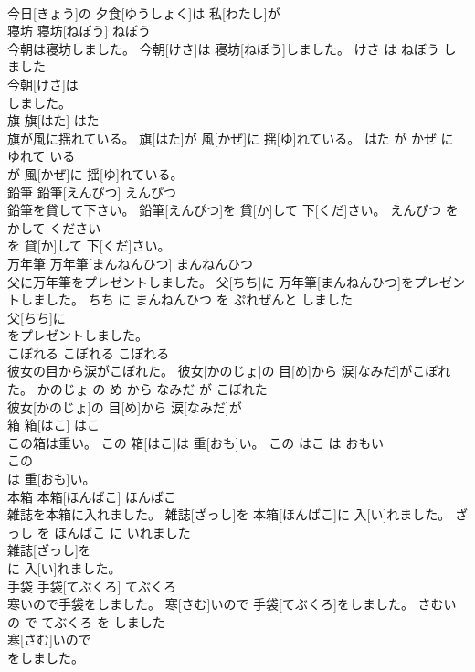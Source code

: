 \documentclass[8pt]{extreport}
\begin{document}
\begin{CJK}{UTF8}{min}
\\	今日[きょう]の 夕食[ゆうしょく]は 私[わたし]が
\\	寝坊	寝坊[ねぼう]	ねぼう	
\\	今朝は寝坊しました。	今朝[けさ]は 寝坊[ねぼう]しました。	けさ は ねぼう しました	
\\	今朝[けさ]は
\\	しました。		
\\	旗	旗[はた]	はた	
\\	旗が風に揺れている。	旗[はた]が 風[かぜ]に 揺[ゆ]れている。	はた が かぜ に ゆれて いる	
\\	が 風[かぜ]に 揺[ゆ]れている。		
\\	鉛筆	鉛筆[えんぴつ]	えんぴつ	
\\	鉛筆を貸して下さい。	鉛筆[えんぴつ]を 貸[か]して 下[くだ]さい。	えんぴつ を かして ください	
\\	を 貸[か]して 下[くだ]さい。		
\\	万年筆	万年筆[まんねんひつ]	まんねんひつ	
\\	父に万年筆をプレゼントしました。	父[ちち]に 万年筆[まんねんひつ]をプレゼントしました。	ちち に まんねんひつ を ぷれぜんと しました	
\\	父[ちち]に
\\	をプレゼントしました。		
\\	こぼれる	こぼれる	こぼれる	
\\	彼女の目から涙がこぼれた。	彼女[かのじょ]の 目[め]から 涙[なみだ]がこぼれた。	かのじょ の め から なみだ が こぼれた	
\\	彼女[かのじょ]の 目[め]から 涙[なみだ]が
\\	箱	箱[はこ]	はこ	
\\	この箱は重い。	この 箱[はこ]は 重[おも]い。	この はこ は おもい	
\\	この
\\	は 重[おも]い。		
\\	本箱	本箱[ほんばこ]	ほんばこ	
\\	雑誌を本箱に入れました。	雑誌[ざっし]を 本箱[ほんばこ]に 入[い]れました。	ざっし を ほんばこ に いれました	
\\	雑誌[ざっし]を
\\	に 入[い]れました。		
\\	手袋	手袋[てぶくろ]	てぶくろ	
\\	寒いので手袋をしました。	寒[さむ]いので 手袋[てぶくろ]をしました。	さむい の で てぶくろ を しました	
\\	寒[さむ]いので
\\	をしました。		

\end{CJK}
\end{document}
